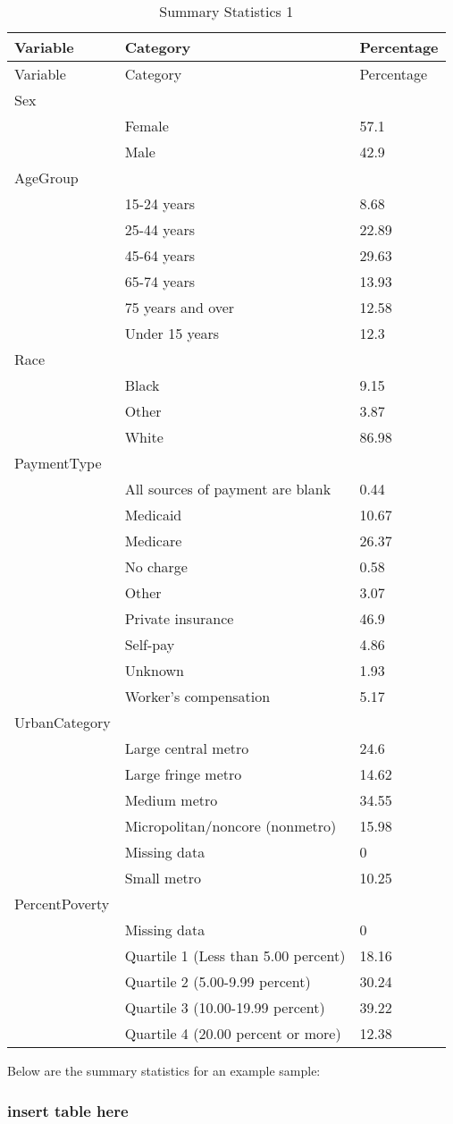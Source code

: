 \documentclass[12pt,twoside]{reedthesis}
\begin{document}
  \newpage
  
  \singlespacing
  
  \begin{longtable}[c]{@{}lll@{}}
  \caption{Summary Statistics 1 \label{tab:sums}}\tabularnewline
  \toprule
  Variable & Category & Percentage\tabularnewline
  \midrule
  \endfirsthead
  \toprule
  Variable & Category & Percentage\tabularnewline
  \midrule
  \endhead
  Sex & &\tabularnewline
  & Female & 57.1\tabularnewline
  & Male & 42.9\tabularnewline
  AgeGroup & &\tabularnewline
  & 15-24 years & 8.68\tabularnewline
  & 25-44 years & 22.89\tabularnewline
  & 45-64 years & 29.63\tabularnewline
  & 65-74 years & 13.93\tabularnewline
  & 75 years and over & 12.58\tabularnewline
  & Under 15 years & 12.3\tabularnewline
  Race & &\tabularnewline
  & Black & 9.15\tabularnewline
  & Other & 3.87\tabularnewline
  & White & 86.98\tabularnewline
  PaymentType & &\tabularnewline
  & All sources of payment are blank & 0.44\tabularnewline
  & Medicaid & 10.67\tabularnewline
  & Medicare & 26.37\tabularnewline
  & No charge & 0.58\tabularnewline
  & Other & 3.07\tabularnewline
  & Private insurance & 46.9\tabularnewline
  & Self-pay & 4.86\tabularnewline
  & Unknown & 1.93\tabularnewline
  & Worker's compensation & 5.17\tabularnewline
  UrbanCategory & &\tabularnewline
  & Large central metro & 24.6\tabularnewline
  & Large fringe metro & 14.62\tabularnewline
  & Medium metro & 34.55\tabularnewline
  & Micropolitan/noncore (nonmetro) & 15.98\tabularnewline
  & Missing data & 0\tabularnewline
  & Small metro & 10.25\tabularnewline
  PercentPoverty & &\tabularnewline
  & Missing data & 0\tabularnewline
  & Quartile 1 (Less than 5.00 percent) & 18.16\tabularnewline
  & Quartile 2 (5.00-9.99 percent) & 30.24\tabularnewline
  & Quartile 3 (10.00-19.99 percent) & 39.22\tabularnewline
  & Quartile 4 (20.00 percent or more) & 12.38\tabularnewline
  \bottomrule
  \end{longtable}
  
  \doublespacing
  Below are the summary statistics for an example sample:
  
  \begin{Shaded}
  \begin{Highlighting}[]
  \end{Highlighting}
  \end{Shaded}
  
  \subsubsection{insert table here}\label{insert-table-here}
  
\end{document}
